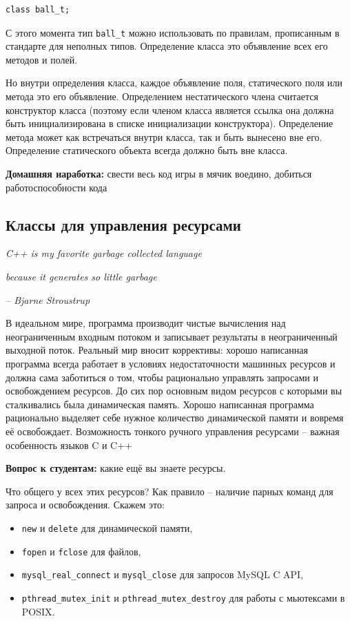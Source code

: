 \documentclass[a4paper,12pt,oneside]{article}
\newif\ifanswers
\begin{document}
\begin{lstlisting}
class ball_t;
\end{lstlisting}

С этого момента тип \lstinline!ball_t! можно использовать по правилам, прописанным в стандарте для неполных типов. Определение класса это объявление всех его методов и полей.

Но внутри определения класса, каждое объявление поля, статического поля или метода это его объявление. Определением нестатического члена считается конструктор класса (поэтому если членом класса является ссылка она должна быть инициализирована в списке инициализации конструктора). Определение метода может как встречаться внутри класса, так и быть вынесено вне его. Определение статического объекта всегда должно быть вне класса.

\textbf{Домашняя наработка:} свести весь код игры в мячик воедино, добиться работоспособности кода

\pagebreak
\subsection{Классы для управления ресурсами}\label{WrapClasses}

\hfill\textit{C++ is my favorite garbage collected language}

\hfill\textit{because it generates so little garbage}{\vspace{0.5em}}

\hfill\textit{-- Bjarne Stroustrup}

В идеальном мире, программа производит чистые вычисления над неограниченным входным потоком и записывает результаты в неограниченный выходной поток. Реальный мир вносит коррективы: хорошо написанная программа всегда работает в условиях недостаточности машинных ресурсов и должна сама заботиться о том, чтобы рационально управлять запросами и освобождением ресурсов. До сих пор основным видом ресурсов с которыми вы сталкивались была динамическая память. Хорошо написанная программа рационально выделяет себе нужное количество динамической памяти и вовремя её освобождает. Возможность тонкого ручного управления ресурсами -- важная особенность языков C и C++

\textbf{Вопрос к студентам:} какие ещё вы знаете ресурсы.

\ifanswers
Ожидаемые ответы: файловые дескрипторы, мьютексы, шрифты и кисти, объекты гуя, соединения с бд, сокеты.
\fi

Что общего у всех этих ресурсов? Как правило -- наличие парных команд для запроса и освобождения. 
Скажем это: 
\begin{itemize}
\item
\lstinline!new! и \lstinline!delete! для динамической памяти, 
\item
\lstinline!fopen! и \lstinline!fclose! для файлов, 
\item
\lstinline!mysql_real_connect! и \lstinline!mysql_close! для запросов MySQL C API, 
\item
\lstinline!pthread_mutex_init! и \lstinline!pthread_mutex_destroy! для работы с мьютексами в POSIX. 
\end{itemize}
\end{document}
